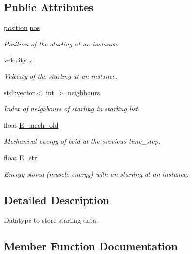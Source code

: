 \subsection*{Public Attributes}
\begin{DoxyCompactItemize}
\item 
\mbox{\hyperlink{classposition}{position}} \mbox{\hyperlink{classstarling_ace1e958bb7963210ca9da7c0454c503e}{pos}}
\begin{DoxyCompactList}\small\item\em Position of the starling at an instance. \end{DoxyCompactList}\item 
\mbox{\hyperlink{classvelocity}{velocity}} \mbox{\hyperlink{classstarling_ad16101cd58b17920b62adf606b1e5dca}{v}}
\begin{DoxyCompactList}\small\item\em Velocity of the starling at an instance. \end{DoxyCompactList}\item 
std\+::vector$<$ int $>$ \mbox{\hyperlink{classstarling_a938ea67b6db6f498070095fc6de15179}{neighbours}}
\begin{DoxyCompactList}\small\item\em Index of neighbours of starling in starling list. \end{DoxyCompactList}\item 
float \mbox{\hyperlink{classstarling_ac37c0c0fe85bdeef7370dbe77d77c9ad}{E\+\_\+mech\+\_\+old}}
\begin{DoxyCompactList}\small\item\em Mechanical energy of boid at the previous time\+\_\+step. \end{DoxyCompactList}\item 
float \mbox{\hyperlink{classstarling_a853076e896a808f546ac5a405dd7c48e}{E\+\_\+str}}
\begin{DoxyCompactList}\small\item\em Energy stored (muscle energy) with an starling at an instance. \end{DoxyCompactList}\end{DoxyCompactItemize}


\subsection{Detailed Description}
Datatype to store starling data. 

\subsection{Member Function Documentation}
\mbox{\label{classstarling_aff2aa7c8238900186857ced2789d589c}} 
